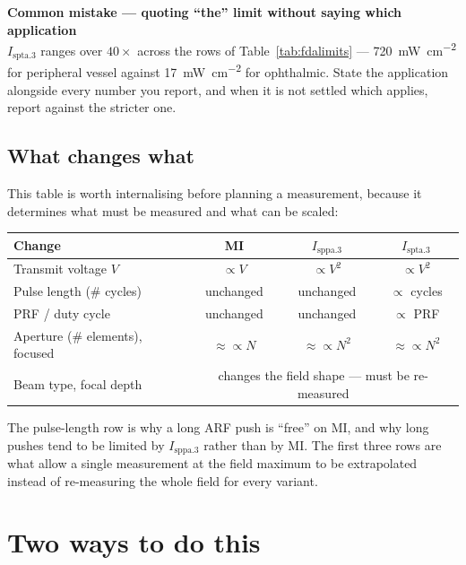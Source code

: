 \documentclass[11pt,a4paper]{article}
\newcommand{\mistaketitle}[1]{\textcolor{orange!75!black}{\textbf{Common mistake --- #1}}\\[2pt]}
\begin{document}
\begin{mistake}
\mistaketitle{quoting ``the'' limit without saying which application}
$I_\mathrm{spta.3}$ ranges over $40\times$ across the rows of Table~\ref{tab:fdalimits} ---
\SI{720}{\milli\watt\per\square\centi\metre} for peripheral vessel against
\SI{17}{\milli\watt\per\square\centi\metre} for ophthalmic. State the application alongside every number you report, and when it is
not settled which applies, report against the stricter one.
\end{mistake}

\subsection{What changes what}
This table is worth internalising before planning a measurement, because it determines what must be
measured and what can be scaled:

\begin{center}
\begin{tabular}{lccc}
\toprule
Change & MI & $I_\mathrm{sppa.3}$ & $I_\mathrm{spta.3}$ \\
\midrule
Transmit voltage $V$            & $\propto V$ & $\propto V^2$ & $\propto V^2$ \\
Pulse length (\# cycles)        & unchanged   & unchanged     & $\propto$ cycles \\
PRF / duty cycle                & unchanged   & unchanged     & $\propto$ PRF \\
Aperture (\# elements), focused & $\approx\propto N$ & $\approx\propto N^2$ & $\approx\propto N^2$ \\
Beam type, focal depth          & \multicolumn{3}{c}{changes the field shape --- must be re-measured} \\
\bottomrule
\end{tabular}
\end{center}

\noindent
The pulse-length row is why a long ARF push is ``free'' on MI, and why long pushes tend to be limited
by $I_\mathrm{sppa.3}$ rather than by MI. The first three rows are what allow a single measurement at
the field maximum to be extrapolated instead of re-measuring the whole field for every variant.

\section{Two ways to do this}\label{sec:approach}
\end{document}
